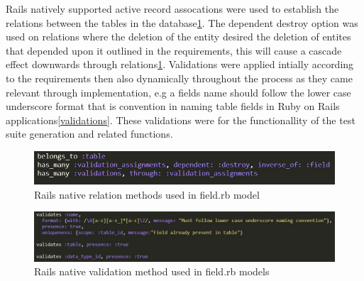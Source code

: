 \documentclass[a4paper,12pt]{article}
\begin{document}
\par Rails natively supported active record assocations were used to establish the relations between the tables in the database\cite{railsara}\ref{fig:relations}. The dependent destroy option was used on relations where the deletion of the entity desired the deletion of entites that depended upon it outlined in the requirements, this will cause a cascade effect downwards through relations\ref{fig:relations}. Validations were applied intially according to the requirements then also dynamically throughout the process as they came relevant through implementation, e.g a fields name should follow the lower case underscore format that is convention in naming table fields in Ruby on Rails applications\ref{validations}. These validations were for the functionallity of the test suite generation and related functions.
\begin{figure}
\includegraphics[width=\linewidth]{screenshots/relations}
\caption{Rails native relation methods used in field.rb model}
\label{fig:relations}
\end{figure}

\begin{figure}
\includegraphics[width=\linewidth]{screenshots/validations}
\caption{Rails native validation method used in field.rb models}
\label{fig:validations}
\end{figure}
\end{document}
